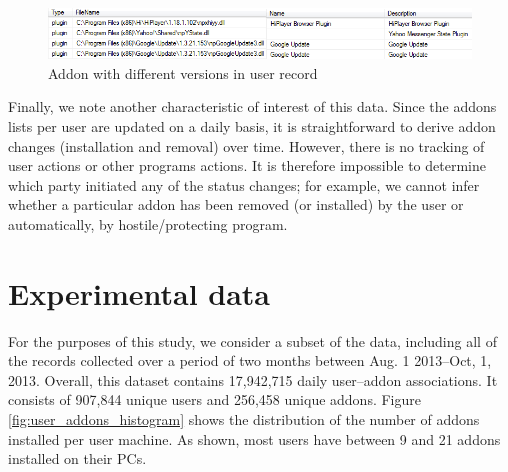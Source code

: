 \documentclass[11pt,oneside]{book}
\let\Oldsection\section
\renewcommand{\section}{\FloatBarrier\Oldsection}
\begin{document}
\begin{figure}[t]
\centering
\begin{small}
\includegraphics[scale=.8,angle=0]{figures/addons_versioning_snapshot_desc.png}
\end{small}
\caption{Addon with different versions in user record}
\label{fig:addons_versioning_snapshot_desc}
\end{figure}

Finally, we note another characteristic of interest of this data.  Since the addons lists per user are updated on a daily basis, it is straightforward to derive addon changes (installation and removal) over time. However, there is no tracking of user actions or other programs actions. It is therefore impossible to determine which party initiated any of the status changes; for example, we cannot infer whether a particular addon has been removed (or installed) by the user or automatically, by hostile/protecting program. 

\section{Experimental data}

For the purposes of this study, we consider a subset of the data, including all of the records collected over a  period of two months between Aug. 1 2013--Oct, 1, 2013. Overall, this dataset contains 17,942,715 daily user--addon associations. It consists of 907,844 unique users and 256,458 unique addons. Figure \ref{fig:user_addons_histogram} shows the distribution of the number of addons installed per user machine. As shown,  most users have between 9 and 21 addons installed on their PCs.

\end{document}

